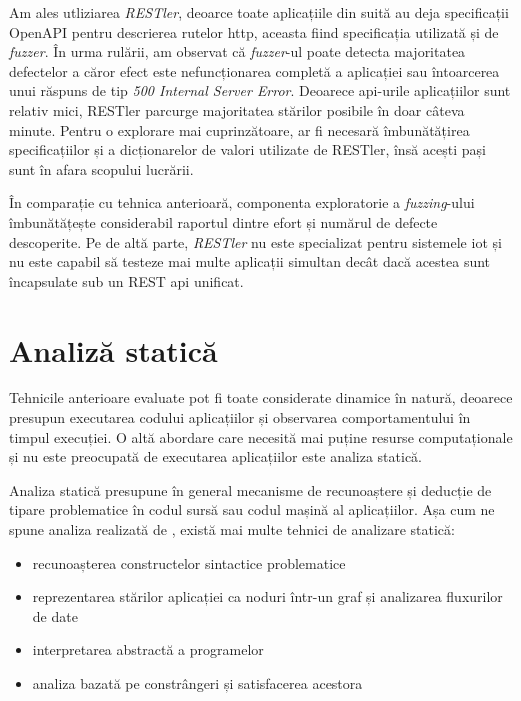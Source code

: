 Am ales utliziarea \textit{RESTler}, deoarce toate aplicațiile din suită au deja specificații OpenAPI pentru descrierea rutelor \acrshort{http}, aceasta fiind specificația utilizată și de \textit{fuzzer}. În urma rulării, am observat că \textit{fuzzer}-ul poate detecta majoritatea defectelor a căror efect este nefuncționarea completă a aplicației sau întoarcerea unui răspuns de tip \textit{500 Internal Server Error}. Deoarece \acrshort{api}-urile aplicațiilor sunt relativ mici, RESTler parcurge majoritatea stărilor posibile în doar câteva minute. Pentru o explorare mai cuprinzătoare, ar fi necesară îmbunătățirea specificațiilor și a dicționarelor de valori utilizate de RESTler, însă acești pași sunt în afara scopului lucrării.

În comparație cu tehnica anterioară, componenta exploratorie a \textit{fuzzing}-ului îmbunătățește considerabil raportul dintre efort și numărul de defecte descoperite. Pe de altă parte, \textit{RESTler} nu este specializat pentru sistemele \acrshort{iot} și nu este capabil să testeze mai multe aplicații simultan decât dacă acestea sunt încapsulate sub un REST \acrshort{api} unificat.


\section{Analiză statică}

Tehnicile anterioare evaluate pot fi toate considerate dinamice în natură, deoarece presupun executarea codului aplicațiilor și observarea comportamentului în timpul execuției. O altă abordare care necesită mai puține resurse computaționale și nu este preocupată de executarea aplicațiilor este analiza statică. 

Analiza statică presupune în general mecanisme de recunoaștere și deducție de tipare problematice în codul sursă sau codul mașină al aplicațiilor. Așa cum ne spune analiza realizată de \citet{Gosain2015}, există mai multe tehnici de analizare statică:
\begin{itemize}
    \item recunoașterea constructelor sintactice problematice
    \item reprezentarea stărilor aplicației ca noduri într-un graf și analizarea fluxurilor de date
    \item interpretarea abstractă a programelor
    \item analiza bazată pe constrângeri și satisfacerea acestora
\end{itemize}

